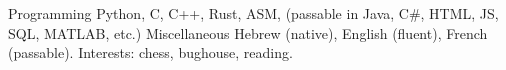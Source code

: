 

\begin{cvskills}

  \cvskill
    {Programming} %
    {Python, C, C++, Rust, ASM, (passable in Java, C\#, HTML, JS, SQL, MATLAB, etc.)} %
  \cvskill
    {Miscellaneous} %
    {Hebrew (native), English (fluent), French (passable). Interests: chess, bughouse, reading.} %
\end{cvskills}
